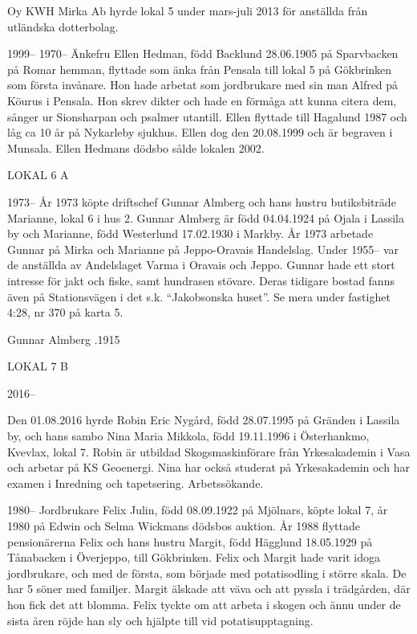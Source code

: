 Oy KWH Mirka Ab hyrde lokal 5 under mars-juli 2013 för anställda från utländska dotterbolag.

 1999--
 1970--
Änkefru Ellen Hedman, född Backlund 28.06.1905 på Sparvbacken på Romar hemman, flyttade som änka från Pensala till lokal 5 på Gökbrinken som första invånare. Hon hade arbetat som jordbrukare med sin man Alfred på Köurus i Pensala. Hon skrev dikter och hade en förmåga att kunna citera dem, sånger ur Sionsharpan och psalmer utantill. Ellen flyttade till Hagalund 1987 och låg ca 10 år på Nykarleby sjukhus. Ellen dog den 20.08.1999 och är begraven i Munsala.
Ellen Hedmans dödsbo sålde lokalen 2002.


LOKAL 6 A

 1973--
År 1973 köpte driftschef Gunnar Almberg och hans hustru butiksbiträde Marianne, lokal 6 i hus 2. Gunnar Almberg är född 04.04.1924 på Ojala i Lassila by och Marianne, född Westerlund 17.02.1930 i Markby.  År 1973 arbetade Gunnar på Mirka och Marianne på Jeppo-Oravais Handelslag. Under 1955-- var de anställda av Andelslaget Varma i Oravais och Jeppo. Gunnar hade ett stort intresse för jakt och fiske, samt hundrasen stövare.
Deras tidigare bostad fanns även på Stationsvägen i det s.k. ``Jakobsonska huset''.  Se mera under fastighet 4:28, nr 370 på karta 5.

Gunnar Almberg .1915


LOKAL 7 B

 2016--

Den 01.08.2016 hyrde Robin Eric Nygård, född 28.07.1995 på Gränden i Lassila by, och hans sambo	Nina Maria Mikkola, född 19.11.1996 i Österhankmo, Kvevlax, lokal 7. Robin är utbildad Skogsmaskinförare från Yrkesakademin i Vasa och arbetar på KS Geoenergi.	Nina har också studerat på Yrkesakademin och har examen i Inredning och tapetsering. Arbetssökande.

 1980--
Jordbrukare Felix Julin, född 08.09.1922 på Mjölnars, köpte lokal 7, år 1980 på Edwin och Selma Wickmans dödsbos auktion. År 1988 flyttade pensionärerna Felix och hans hustru Margit, född Hägglund 18.05.1929 på Tånabacken i Överjeppo, till Gökbrinken. Felix och Margit hade varit idoga jordbrukare, och med de första, som började med potatisodling i större skala. De har 5 söner med familjer. Margit älskade att väva och att pyssla i trädgården, där hon fick det att blomma. Felix tyckte om att arbeta i skogen och ännu under de sista åren röjde han sly och hjälpte till vid potatisupptagning.

